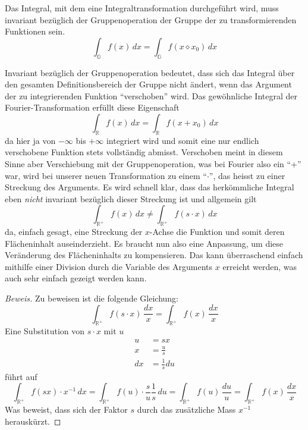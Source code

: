 \begin{definition}
    Das Integral, mit dem eine Integraltransformation durchgeführt wird, 
    muss invariant bezüglich der Gruppenoperation der Gruppe 
    der zu transformierenden Funktionen sein.
    \[
        \int_\mathbb{G} f(x)\,{d}x 
        = \int_\mathbb{G} f(x \diamond x_0)\,{d}x
    \]
\end{definition}


Invariant bezüglich der Gruppenoperation bedeutet, dass sich das Integral 
über den gesamten Definitionsbereich der Gruppe nicht ändert, wenn das 
Argument der zu integrierenden Funktion ``verschoben'' wird. 
Das gewöhnliche Integral der Fourier-Transformation erfüllt diese 
Eigenschaft 
\begin{equation}
    \int_\mathbb{R} f(x)\,{d}x 
    = \int_\mathbb{R} f(x + x_0)\,{d}x
\end{equation}
da hier ja von $-\infty$ bis $+\infty$ integriert wird und somit eine nur 
endlich verschobene Funktion stets vollständig abmisst.
Verschoben meint in diesem Sinne aber Verschiebung mit der Gruppenoperation, 
was bei Fourier also ein ``+'' war, wird bei unserer neuen Transformation 
zu einem ``$\cdot$'', das heisst zu einer Streckung des Arguments. 
Es wird schnell klar, dass das herkömmliche Integral eben {\em nicht} 
invariant bezüglich dieser Streckung ist und allgemein gilt 
\begin{equation}
    \int_\mathbb{R^+} 
    f(x)\,{d}x \neq \int_\mathbb{R^+} f(s \cdot x)\,{d}x
    \label{mellin:ungl}
\end{equation}
da, einfach gesagt, eine Streckung der $x$-Achse die Funktion und somit deren 
Flächeninhalt auseinderzieht.
Es braucht nun also eine Anpassung, um diese Veränderung des Flächeninhalts 
zu kompensieren.
Das kann überraschend einfach mithilfe einer Division durch die Variable 
des Arguments $x$ erreicht werden, was auch sehr einfach gezeigt werden 
kann.
\begin{proof}[Beweis]
    Zu beweisen ist die folgende Gleichung:
    \[
        \int_\mathbb{R^+} f(s \cdot x)\,\frac{{d}x}{x} 
        = \int_\mathbb{R^+} f(x)\,\frac{{d}x}{x}
    \]
    Eine Substitution von $s \cdot x$ mit $u$
    \begin{align*}
        u &= sx \\
        x &= \frac{u}{s} \\
        {d}x &= \frac{1}{s} {d}u
    \end{align*}
    führt auf
    \[
        \int_\mathbb{R^+} f(sx) \cdot x^{-1}\,{d}x 
        = \int_\mathbb{R^+} f(u) \cdot \frac{s}{u} \frac{1}{s}\,{d}u
        = \int_\mathbb{R^+} f(u)\,\frac{{d}u}{u}
        = \int_\mathbb{R^+} f(x)\,\frac{{d}x}{x}
    \]
    Was beweist, dass sich der Faktor $s$ durch das zusätzliche Mass 
    $x^{-1}$ herauskürzt.
\end{proof}
